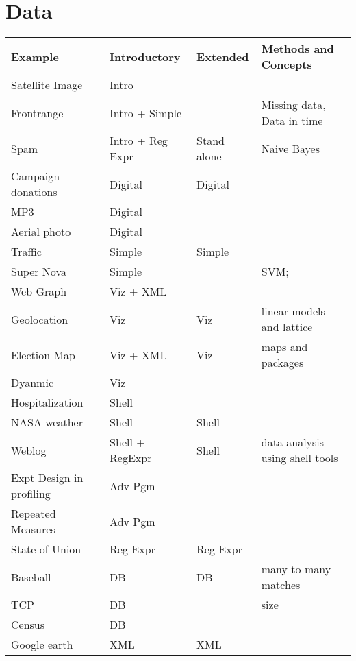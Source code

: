 \documentclass[11pt,timesroman]{article}
\begin{document}
\begin{comment}
Other data possibilities -\\
thousands of satellite images of the ocean around the Farallon islands - used
in the search for Jim Gray's missing sailboat
\\
NASA registry of large pieces of junk in orbit around the earth - used
to plan space shuttle and satellite routes
\\
netcdf file - simulated data from weather models
\\
\end{comment}
\section*{Data}

\begin{tabular}{l|l|l|l}
Example & Introductory & Extended & Methods and Concepts\\
\hline
\hline
Satellite Image & Intro & & \\
Frontrange & Intro + Simple & & Missing data, Data in time \\
Spam & Intro + Reg Expr & Stand alone &Naive Bayes \\
Campaign donations & Digital & Digital &  \\
MP3 & Digital & &  \\
Aerial photo & Digital &  & \\
Traffic & Simple & Simple & \\
Super Nova & Simple & &SVM;  \\
Web Graph & Viz + XML & &\\
Geolocation & Viz & Viz & linear models and lattice \\
Election Map & Viz + XML & Viz & maps and packages \\
Dyanmic  & Viz & & \\
Hospitalization & Shell & & \\
NASA weather & Shell & Shell & \\
Weblog & Shell + RegExpr & Shell & data analysis using shell tools \\
Expt Design in profiling & Adv Pgm & & \\
Repeated Measures & Adv Pgm & & \\
State of Union & Reg Expr & Reg Expr & \\
Baseball & DB & DB & many to many matches \\
TCP & DB & & size \\
Census & DB & & \\
Google earth & XML & XML & \\
\end{tabular}
\end{document}
